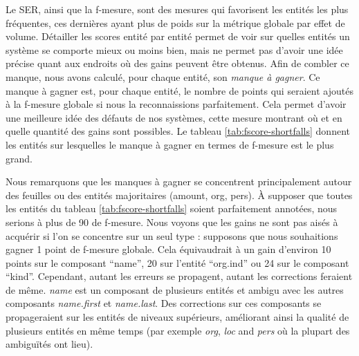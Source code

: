 \documentclass[PhD-Yoann-Dupont.tex]{subfiles}
\begin{document}
Le SER, ainsi que la f-mesure, sont des mesures qui favorisent les entités les plus fréquentes, ces dernières ayant plus de poids sur la métrique globale par effet de volume. Détailler les scores entité par entité permet de voir sur quelles entités un système se comporte mieux ou moins bien, mais ne permet pas d'avoir une idée précise quant aux endroits où des gains peuvent être obtenus. Afin de combler ce manque, nous avons calculé, pour chaque entité, son \emph{manque à gagner}. Ce manque à gagner est, pour chaque entité, le nombre de points qui seraient ajoutés à la f-mesure globale si nous la reconnaissions parfaitement. Cela permet d'avoir une meilleure idée des défauts de nos systèmes, cette mesure montrant où et en quelle quantité des gains sont possibles.
Le tableau \ref{tab:fscore-shortfalls} donnent les entités sur lesquelles le manque à gagner en termes de f-mesure est le plus grand.

Nous remarquons que les manques à gagner se concentrent principalement autour des feuilles ou des entités majoritaires (amount, org, pers). À supposer que toutes les entités du tableau \ref{tab:fscore-shortfalls} soient parfaitement annotées, nous serions à plus de 90 de f-mesure. Nous voyons que les gains ne sont pas aisés à acquérir si l'on se concentre sur un seul type : supposons que nous souhaitions gagner 1 point de f-mesure globale. Cela équivaudrait à un gain d'environ 10 points sur le composant ``name'', 20 sur l'entité ``org.ind'' ou 24 sur le composant ``kind''. Cependant, autant les erreurs se propagent, autant les corrections feraient de même. \emph{name} est un composant de plusieurs entités et ambigu avec les autres composants \emph{name.first} et \emph{name.last}. Des corrections sur ces composants se propageraient sur les entités de niveaux supérieurs, améliorant ainsi la qualité de plusieurs entités en même temps (par exemple \emph{org}, \emph{loc} and \emph{pers} où la plupart des ambiguïtés ont lieu).
\end{document}
